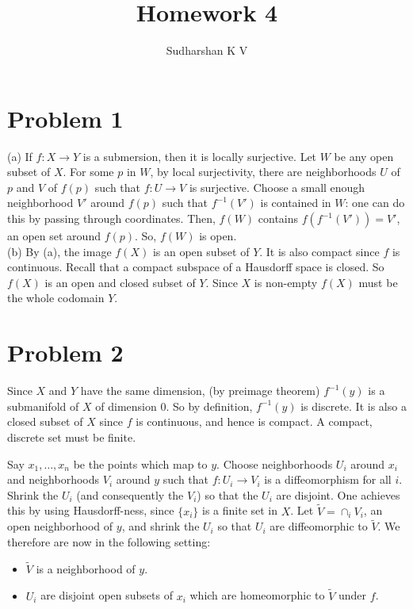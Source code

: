 \documentclass{amsart}
\title{Homework 4}
\author{Sudharshan K V}
\numberwithin{equation}{section}
\theoremstyle{plain}
\theoremstyle{definition}
\theoremstyle{remark}
\renewcommand{\_}[2]{\underbrace{#1}_{#2}}
\renewcommand{\^}[2]{\overbrace{#1}_{#2}}
\begin{document}
\maketitle

\section*{Problem 1}
(a) If $f: X \to Y$ is a submersion, then it is locally surjective. Let $W$ be any open subset of $X$. For some $p$ in $W$, by local surjectivity, there are neighborhoods $U$ of $p$ and $V$ of $f(p)$ such that $f: U \to V$ is surjective. Choose a small enough neighborhood $V'$ around $f(p)$ such that $f^{-1}(V')$ is contained in $W$: one can do this by passing through coordinates. Then, $f(W)$ contains $f(f^{-1}(V')) = V'$, an open set around $f(p)$. So, $f(W)$ is open.  \\

(b) By (a), the image $f(X)$ is an open subset of $Y$. It is also compact since $f$ is continuous. Recall that a compact subspace of a Hausdorff space is closed. So $f(X)$ is an open and closed subset of $Y$. Since $X$ is non-empty $f(X)$ must be the whole codomain $Y$. 

\section*{Problem 2}
Since $X$ and $Y$ have the same dimension, (by preimage theorem) $f^{-1}(y)$ is a submanifold of $X$ of dimension $0$. So by definition, $f^{-1}(y)$ is discrete. It is also a closed subset of $X$ since $f$ is continuous, and hence is compact. A compact, discrete set must be finite.

Say $x_1, \dots, x_n$ be the points which map to $y$. Choose neighborhoods $U_i$ around $x_i$ and neighborhoods $V_i$ around $y$ such that $f: U_i \to V_i$ is a diffeomorphism for all $i$. Shrink the $U_i$ (and consequently the $V_i$) so that the $U_i$ are disjoint. One achieves this by using Hausdorff-ness, since $\{x_i\}$ is a finite set in $X$. Let $\tilde V = \cap_i V_i$, an open neighborhood of $y$, and shrink the $U_i$ so that $U_i$ are diffeomorphic to $\tilde V$. We therefore are now in the following setting:

\begin{itemize}
\item $\tilde V$ is a neighborhood of $y$.
\item $U_i$ are disjoint open subsets of $x_i$ which are homeomorphic to $\tilde V$ under $f$.
\end{itemize}
\end{document}
